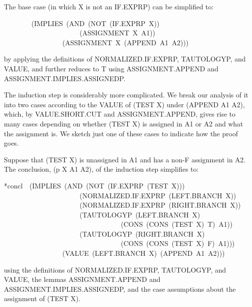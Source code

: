 \documentclass[11pt]{book}
\newenvironment{pubasis}{\begin{flushleft}\ttfamily\small}{\normalsize\rmfamily\end{flushleft}}
\begin{document}
The base case (in which X is not an IF.EXPRP) can be simplified to:
\begin{pubasis}
~~~~~~~~(IMPLIES~(AND~(NOT~(IF.EXPRP~X))\\
~~~~~~~~~~~~~~~~~~~~~~(ASSIGNMENT~X~A1))\\
~~~~~~~~~~~~~~~~~(ASSIGNMENT~X~(APPEND~A1~A2)))\\
\end{pubasis}
by applying the definitions of NOR\-MAL\-IZED.IF.EXPRP, TAU\-TOL\-OGYP, and VALUE,
and further reduces to T using ASSIGN\-MENT.APPEND and ASSIGN\-MENT.IMPLIES.ASSIGNEDP.

The induction step is considerably more complicated.  We break our analysis
of it into two cases according to the VALUE of (TEST X) under (APPEND A1 A2),
which, by VALUE.SHORT.CUT and ASSIGN\-MENT.APPEND, gives rise to
many cases depending on whether (TEST X) is assigned in A1 or A2 and what
the assignment is.  We sketch just one of these cases to indicate
how the proof goes.

Suppose that (TEST X) is unassigned in A1 and has a non-F assignment
in A2.  The conclusion, (p X A1 A2), of the induction step
simplifies to:
\begin{pubasis}
*concl~~(IMPLIES~(AND~(NOT~(IF.EXPRP~(TEST~X)))\\
~~~~~~~~~~~~~~~~~~~~~~(NOR\-MAL\-IZED.IF.EXPRP~(LEFT.BRANCH~X))\\
~~~~~~~~~~~~~~~~~~~~~~(NOR\-MAL\-IZED.IF.EXPRP~(RIGHT.BRANCH~X))\\
~~~~~~~~~~~~~~~~~~~~~~(TAU\-TOL\-OGYP~(LEFT.BRANCH~X)\\
~~~~~~~~~~~~~~~~~~~~~~~~~~~~~~~~~~(CONS~(CONS~(TEST~X)~T)~A1))\\
~~~~~~~~~~~~~~~~~~~~~~(TAU\-TOL\-OGYP~(RIGHT.BRANCH~X)\\
~~~~~~~~~~~~~~~~~~~~~~~~~~~~~~~~~~(CONS~(CONS~(TEST~X)~F)~A1)))\\
~~~~~~~~~~~~~~~~~(VALUE~(LEFT.BRANCH~X)~(APPEND~A1~A2)))\\
\end{pubasis}
using the definitions of NOR\-MAL\-IZED.IF.EXPRP, TAU\-TOL\-OGYP, and VALUE,
the lemmas ASSIGN\-MENT.APPEND and ASSIGN\-MENT.IMPLIES.ASSIGNEDP,
and the case assumptions about the assignment of (TEST X).
\end{document}
